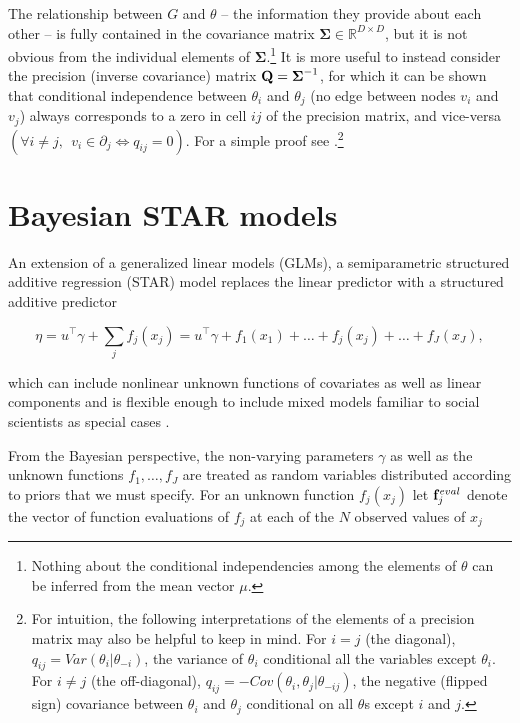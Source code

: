 The relationship between $G$ and $\theta$ -- the information they provide about each other -- is fully contained in the covariance matrix $\boldsymbol{\Sigma} \in \mathbb{R}^{D\times D}$, but it is not obvious from the individual elements of $\boldsymbol{\Sigma}$.\footnote{Nothing about the conditional independencies among the elements of $\theta$ can be inferred from the mean vector $\mu$.} It is more useful to instead consider the precision (inverse covariance) matrix $\mathbf{Q} =\boldsymbol{\Sigma}^{-1}$, for which it can be shown that conditional independence between $\theta_i$ and $\theta_j$ (no edge between nodes $v_i$ and $v_j$) always corresponds to a zero in cell $ij$ of the precision matrix, and vice-versa $(\forall i \neq j, \:\: v_i \in \partial_j \iff q_{ij} = 0)$.  For a simple proof see .\footnote{For intuition, the following interpretations of the elements of a precision matrix may also be helpful to keep in mind. For $i = j$ (the diagonal),  $q_{ij} = Var(\theta_i | \theta_{-i})$, the variance of $\theta_i$ conditional all the variables except $\theta_i$. For $i \neq j$ (the off-diagonal), $q_{ij}  = -Cov(\theta_i, \theta_j | \theta_{-ij}) $, the negative (flipped sign) covariance between $\theta_i$ and $\theta_j$ conditional on all $\theta$s except $i$ and $j$.  }






\section{Bayesian STAR models}
\label{star}

An extension of a generalized linear models (GLMs), a semiparametric structured additive regression (STAR) model replaces the linear predictor with a structured additive predictor

\begin{equation*}
\eta =  u^\intercal\gamma + \sum_{j} f_j (x_j) =  u^\intercal\gamma + f_1(x_1) + \ldots + f_j(x_j) + \ldots + f_J(x_J),
\end{equation*}

\noindent which can include nonlinear unknown functions of covariates as well as linear components and is flexible enough to include mixed models familiar to social scientists as special cases . 

From the Bayesian perspective, the non-varying parameters $\gamma$ as well as the unknown functions $f_1, \dots, f_J$ are treated as random variables distributed according to priors that we must specify. For an unknown function $f_j(x_j)$ let $\mathbf{f}_j^{eval}$ denote the vector of function evaluations of $f_j$ at each of the $N$ observed values of $x_j$ 


